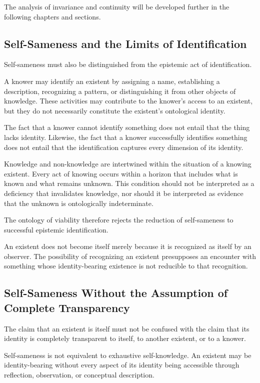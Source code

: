 The analysis of invariance and continuity will be developed further in the following chapters and sections.

\subsection{Self-Sameness and the Limits of Identification}

Self-sameness must also be distinguished from the epistemic act of identification.

A knower may identify an existent by assigning a name, establishing a description, recognizing a pattern, or distinguishing it from other objects of knowledge. These activities may contribute to the knower's access to an existent, but they do not necessarily constitute the existent's ontological identity.

The fact that a knower cannot identify something does not entail that the thing lacks identity. Likewise, the fact that a knower successfully identifies something does not entail that the identification captures every dimension of its identity.

Knowledge and non-knowledge are intertwined within the situation of a knowing existent. Every act of knowing occurs within a horizon that includes what is known and what remains unknown. This condition should not be interpreted as a deficiency that invalidates knowledge, nor should it be interpreted as evidence that the unknown is ontologically indeterminate.

The ontology of viability therefore rejects the reduction of self-sameness to successful epistemic identification.

An existent does not become itself merely because it is recognized as itself by an observer. The possibility of recognizing an existent presupposes an encounter with something whose identity-bearing existence is not reducible to that recognition.

\subsection{Self-Sameness Without the Assumption of Complete Transparency}

The claim that an existent is itself must not be confused with the claim that its identity is completely transparent to itself, to another existent, or to a knower.

Self-sameness is not equivalent to exhaustive self-knowledge. An existent may be identity-bearing without every aspect of its identity being accessible through reflection, observation, or conceptual description.

